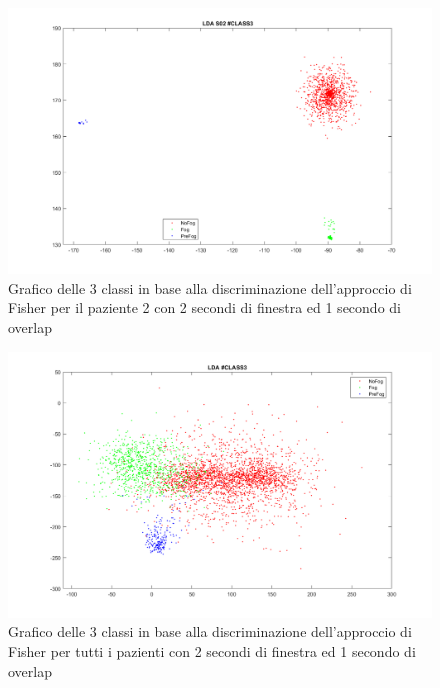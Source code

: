 \begin{figure}[]
	\centering
	\includegraphics[scale=0.3]{images/LDAS02_best.png}
	\caption{Grafico delle 3 classi in base alla discriminazione dell'approccio di Fisher per il paziente 2 con 2 secondi di finestra ed 1 secondo di overlap}
	\label{LDAS02_best.png}
\end{figure}
\begin{figure}[]
	\centering
	\includegraphics[scale=0.3]{images/LDAALL2.png}
	\caption{Grafico delle 3 classi in base alla discriminazione dell'approccio di Fisher per tutti i pazienti con 2 secondi di finestra ed 1 secondo di overlap}
	\label{LDAALL2.png}
\end{figure}

